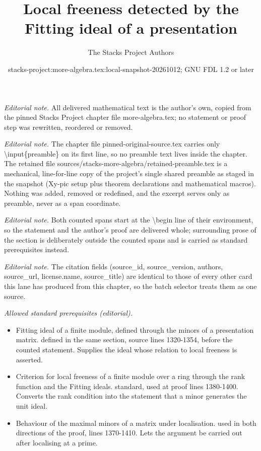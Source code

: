 \documentclass[10pt,a4paper]{amsart}
\title{Local freeness detected by the Fitting ideal of a presentation}
\author{The Stacks Project Authors}
\date{stacks-project:more-algebra.tex:local-snapshot-20261012; GNU FDL 1.2 or later}
\theoremstyle{plain}
\theoremstyle{definition}
\theoremstyle{remark}
\numberwithin{equation}{subsection}
\begin{document}
\maketitle
\setcounter{subsection}{1}
\noindent\textit{Editorial note.} All delivered mathematical text is the author's own, copied from the pinned Stacks Project chapter file more-algebra.tex; no statement or proof step was rewritten, reordered or removed.\par\medskip
\noindent\textit{Editorial note.} The chapter file pinned-original-source.tex carries only \textbackslash{}input\{preamble\} on its first line, so no preamble text lives inside the chapter. The retained file sources/stacks-more-algebra/retained-preamble.tex is a mechanical, line-for-line copy of the project's single shared preamble as staged in the snapshot (Xy-pic setup plus theorem declarations and mathematical macros). Nothing was added, removed or redefined, and the excerpt serves only as preamble, never as a span coordinate.\par\medskip
\noindent\textit{Editorial note.} Both counted spans start at the \textbackslash{}begin line of their environment, so the statement and the author's proof are delivered whole; surrounding prose of the section is deliberately outside the counted spans and is carried as standard prerequisites instead.\par\medskip
\noindent\textit{Editorial note.} The citation fields (source\_id, source\_version, authors, source\_url, license.name, source\_title) are identical to those of every other card this lane has produced from this chapter, so the batch selector treats them as one source.\par\medskip
\noindent\textit{Allowed standard prerequisites (editorial).}\begin{itemize}
\item Fitting ideal of a finite module, defined through the minors of a presentation matrix. defined in the same section, source lines 1320-1354, before the counted statement. Supplies the ideal whose relation to local freeness is asserted.
\item Criterion for local freeness of a finite module over a ring through the rank function and the Fitting ideals. standard, used at proof lines 1380-1400. Converts the rank condition into the statement that a minor generates the unit ideal.
\item Behaviour of the maximal minors of a matrix under localisation. used in both directions of the proof, lines 1370-1410. Lets the argument be carried out after localising at a prime.
\end{itemize}\medskip
\end{document}
